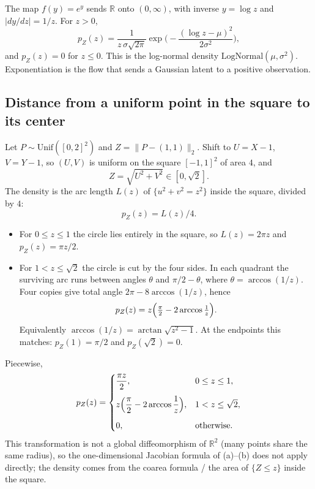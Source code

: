 \documentclass[11pt]{article}
\newcommand{\R}{\mathbb{R}}
\begin{document}
The map \(f(y)=e^y\) sends \(\R\) onto \((0,\infty)\), with inverse
\(y=\log z\) and \(|dy/dz|=1/z\). For \(z>0\),
\begin{equation}
  p_Z(z)
  =\frac{1}{z\,\sigma\sqrt{2\pi}}
  \exp\Biggl(-\frac{(\log z-\mu)^2}{2\sigma^2}\Biggr),
\end{equation}
and \(p_Z(z)=0\) for \(z\le 0\). This is the log-normal density
\(\mathrm{LogNormal}(\mu,\sigma^2)\). Exponentiation is the flow that
sends a Gaussian latent to a positive observation.

\subsection{Distance from a uniform point in the square to its center}

Let \(P\sim\mathrm{Unif}([0,2]^2)\) and \(Z=\|P-(1,1)\|_2\). Shift to
\(U=X-1\), \(V=Y-1\), so \((U,V)\) is uniform on the square
\([-1,1]^2\) of area \(4\), and
\[
  Z=\sqrt{U^2+V^2}\in[0,\sqrt{2}].
\]
The density is the arc length \(L(z)\) of \(\{u^2+v^2=z^2\}\) inside the
square, divided by \(4\):
\[
  p_Z(z)=L(z)/4.
\]

\begin{itemize}
  \item For \(0\le z\le 1\) the circle lies entirely in the square, so
    \(L(z)=2\pi z\) and \(p_Z(z)=\pi z/2\).
  \item For \(1<z\le\sqrt{2}\) the circle is cut by the four sides. In
    each quadrant the surviving arc runs between angles \(\theta\) and
    \(\pi/2-\theta\), where \(\theta=\arccos(1/z)\). Four copies give
    total angle \(2\pi-8\arccos(1/z)\), hence
    \[
      p_Z(z)
      =z\Bigl(\tfrac{\pi}{2}-2\arccos\tfrac{1}{z}\Bigr).
    \]
    Equivalently \(\arccos(1/z)=\arctan\sqrt{z^2-1}\). At the endpoints
    this matches: \(p_Z(1)=\pi/2\) and \(p_Z(\sqrt{2})=0\).
\end{itemize}
Piecewise,
\begin{equation}
  p_Z(z)=
  \begin{cases}
    \dfrac{\pi z}{2},
      & 0\le z\le 1,\\[10pt]
    z\Bigl(\dfrac{\pi}{2}-2\arccos\dfrac{1}{z}\Bigr),
      & 1<z\le\sqrt{2},\\[10pt]
    0,
      & \text{otherwise.}
  \end{cases}
\end{equation}
This transformation is not a global diffeomorphism of \(\R^2\) (many
points share the same radius), so the one-dimensional Jacobian formula
of (a)--(b) does not apply directly; the density comes from the coarea
formula / the area of \(\{Z\le z\}\) inside the square.
\end{document}
